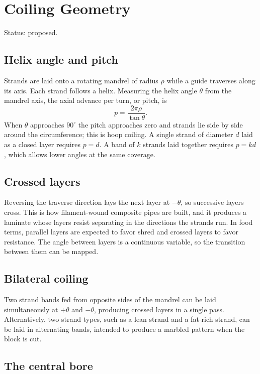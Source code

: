 \documentclass[11pt,openany]{book}
\theoremstyle{definition}
\begin{document}
\chapter{Coiling Geometry}\label{ch:coil}

Status: proposed.

\section{Helix angle and pitch}

Strands are laid onto a rotating mandrel of radius $\rho$ while a guide traverses along its axis. Each strand follows a helix. Measuring the helix angle $\theta$ from the mandrel axis, the axial advance per turn, or pitch, is
\[
p = \frac{2\pi\rho}{\tan\theta}.
\]
When $\theta$ approaches $90^\circ$ the pitch approaches zero and strands lie side by side around the circumference; this is hoop coiling. A single strand of diameter $d$ laid as a closed layer requires $p = d$. A band of $k$ strands laid together requires $p = kd$, which allows lower angles at the same coverage.

\section{Crossed layers}

Reversing the traverse direction lays the next layer at $-\theta$, so successive layers cross. This is how filament-wound composite pipes are built, and it produces a laminate whose layers resist separating in the directions the strands run. In food terms, parallel layers are expected to favor shred and crossed layers to favor resistance. The angle between layers is a continuous variable, so the transition between them can be mapped.

\section{Bilateral coiling}

Two strand bands fed from opposite sides of the mandrel can be laid simultaneously at $+\theta$ and $-\theta$, producing crossed layers in a single pass. Alternatively, two strand types, such as a lean strand and a fat-rich strand, can be laid in alternating bands, intended to produce a marbled pattern when the block is cut.

\section{The central bore}
\end{document}
